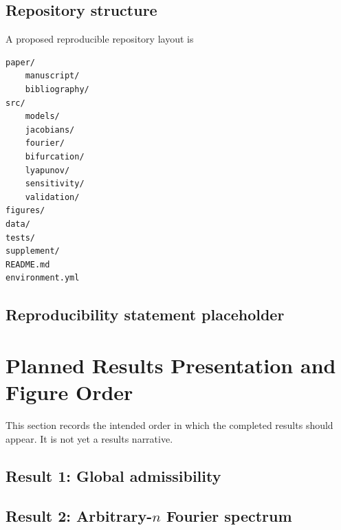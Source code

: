 \documentclass[11pt, reqno]{amsart}
\theoremstyle{definition}
\theoremstyle{remark}
\begin{document}
\subsection{Repository structure}

A proposed reproducible repository layout is
\begin{verbatim}
paper/
    manuscript/
    bibliography/
src/
    models/
    jacobians/
    fourier/
    bifurcation/
    lyapunov/
    sensitivity/
    validation/
figures/
data/
tests/
supplement/
README.md
environment.yml
\end{verbatim}

\subsection{Reproducibility statement placeholder}


\section{Planned Results Presentation and Figure Order}
\label{sec:planned-results}

This section records the intended order in which the completed results should
appear.  It is not yet a results narrative.

\subsection{Result 1: Global admissibility}


\subsection{Result 2: Arbitrary-$n$ Fourier spectrum}

\end{document}
